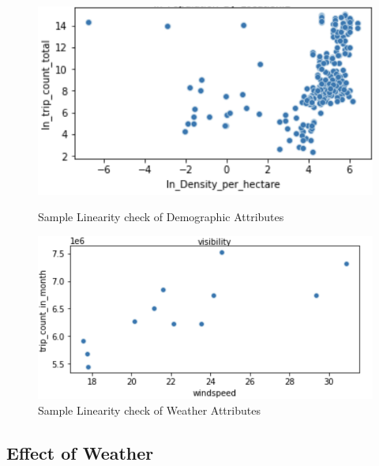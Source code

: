 \documentclass[11pt]{article}
\begin{document}
\begin{figure}[h]
    \centering
    \begin{minipage}{0.45\textwidth}
        \centering
        \includegraphics[width=1.2\textwidth]{plots/Screen Shot 2022-08-23 at 8.35.00 pm.png}
        \caption{Sample Linearity check of Demographic Attributes}
        \label{fig:demolinearity}
    \end{minipage}\hfill
    \begin{minipage}{0.45\textwidth}
        \centering
        \includegraphics[width=1.2\textwidth]{plots/Screen Shot 2022-08-23 at 5.14.12 pm.png}
        \caption{Sample Linearity check of Weather Attributes}
        \label{fig:weatherlinearity}
    \end{minipage}
\end{figure}
\subsection{Effect of Weather}
\end{document}
